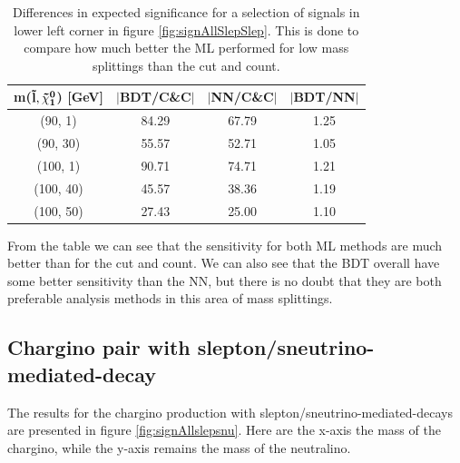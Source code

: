 \begin{table}[H]
    \centering
    \begin{tabular}{c c c c}
    \toprule
    \textbf{m($\mathbf{\Tilde{l}, \Tilde{\chi}_1^0}$) [GeV]} & \textbf{$|$BDT/C\&C$|$} & \textbf{$|$NN/C\&C$|$} & \textbf{$|$BDT/NN$|$}\\
    \midrule
    \midrule
        (90, 1)     & 84.29     & 67.79     & 1.25  \\
        (90, 30)    & 55.57     & 52.71     & 1.05  \\
        (100, 1)    & 90.71     & 74.71     & 1.21  \\  
        (100, 40)   & 45.57     & 38.36     & 1.19  \\
        (100, 50)   & 27.43     & 25.00     & 1.10  \\
    \bottomrule
    \end{tabular}
    \caption{Differences in expected significance for a selection of signals in lower left corner in figure \ref{fig:signAllSlepSlep}. This is done to compare how much better the ML performed for low mass splittings than the cut and count.}
    \label{tab:diffSlepslep}
\end{table}

From the table we can see that the sensitivity for both ML methods are much better than for the cut and count. We can also see that the BDT overall have some better sensitivity than the NN, but there is no doubt that they are both preferable analysis methods in this area of mass splittings. 









\subsection{Chargino pair with slepton/sneutrino-mediated-decay}
\label{sec:resC1C1_SlepSnu}

The results for the chargino production with slepton/sneutrino-mediated-decays are presented in figure \ref{fig:signAllslepsnu}. Here are the x-axis the mass of the chargino, while the y-axis remains the mass of the neutralino.

